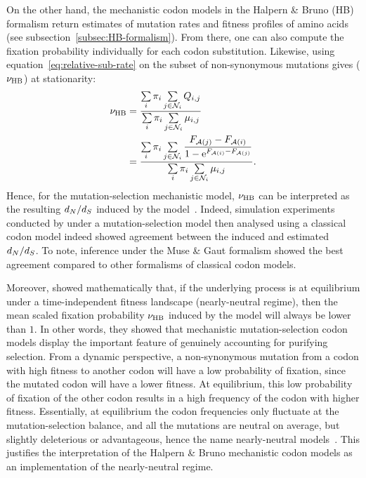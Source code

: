 On the other hand, the mechanistic codon models in the Halpern \& Bruno (\acrshort{HB}) formalism return estimates of mutation rates and fitness profiles of amino acids (see subsection~\ref{subsec:HB-formalism}).
From there, one can also compute the fixation probability individually for each codon substitution.
Likewise, using equation~\ref{eq:relative-sub-rate} on the subset of non-synonymous mutations gives ($\nu_{\text{HB}}$) at stationarity:
\begin{align}
    \nu_{\text{HB}} & = \dfrac{ \sum\limits_{{i}} \pi_{{i}} \sum\limits_{{j} \in \mathcal{N}_{{i}}} Q_{{i}, {j}}}{\sum\limits_{{i}} \pi_{{i}} \sum\limits_{{j} \in \mathcal{N}_{{i}}} \mu_{{i}, {j}}} \\
    & = \dfrac{ \sum\limits_{i} \pi_{i} \sum\limits_{j \in \mathcal{N}_{{i}}} \dfrac{F_{\mathcal{A}({j})} - F_{\mathcal{A}({i})}}{1 - \text{e}^{F_{\mathcal{A}({i})} - F_{\mathcal{A}({j})}} }}{\sum\limits_{i} \pi_{i} \sum\limits_{j \in \mathcal{N}_{{i}} } \mu_{{i}, {j}}}.
\end{align}
Hence, for the mutation-selection mechanistic model, $\nu_{\text{HB}}$ can be interpreted as the resulting $d_N / d_S$ induced by the model~\citep{Spielman2015,DosReis2015}.
Indeed, simulation experiments conducted by \citet{Spielman2015} under a mutation-selection model then analysed using a classical codon model indeed showed agreement between the induced and estimated $d_N / d_S$.
To note, inference under the Muse \& Gaut formalism showed the best agreement compared to other formalisms of classical codon models.

Moreover, \citet{Spielman2015} showed mathematically that, if the underlying process is at equilibrium under a time-independent fitness landscape (nearly-neutral regime), then the mean scaled fixation probability $\nu_{\text{HB}}$ induced by the model will always be lower than $1$.
In other words, they showed that mechanistic mutation-selection codon models display the important feature of genuinely accounting for purifying selection.
From a dynamic perspective, a non-synonymous mutation from a codon with high fitness to another codon will have a low probability of fixation, since the mutated codon will have a lower fitness.
At equilibrium, this low probability of fixation of the other codon results in a high frequency of the codon with higher fitness.
Essentially, at equilibrium the codon frequencies only fluctuate at the mutation-selection balance, and all the mutations are neutral on average, but slightly deleterious or advantageous, hence the name nearly-neutral models~\citep{Ohta1973, Ohta1992, Rodrigue2016}.
This justifies the interpretation of the Halpern \& Bruno mechanistic codon models as an implementation of the nearly-neutral regime.

